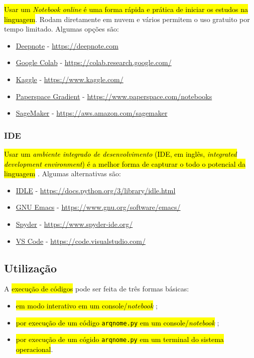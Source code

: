 \documentclass[12pt]{article}
\begin{document}
\hl{Usar um \emph{\textit{Notebook} {\python} \textit{online}} é uma forma rápida e prática de iniciar os estudos na linguagem}. Rodam diretamente em nuvem e vários permitem o uso gratuito por tempo limitado. Algumas opções são:
\begin{itemize}
\item \href{https://deepnote.com}{Deepnote} - \url{https://deepnote.com}
\item \href{https://colab.research.google.com/}{Google Colab} - \url{https://colab.research.google.com/}
\item \href{https://www.kaggle.com/}{Kaggle} - \url{https://www.kaggle.com/}
\item \href{https://www.paperspace.com/notebooks}{Paperspace Gradient} - \url{https://www.paperspace.com/notebooks}
\item \href{https://aws.amazon.com/sagemaker/}{SageMaker} - \url{https://aws.amazon.com/sagemaker}
\end{itemize}

\subsubsection{IDE}

\hl{Usar um \emph{ambiente integrado de desenvolvimento} (IDE, em inglês, \textit{integrated development environment}) é a melhor forma de capturar o todo o potencial da linguagem {\python}}. Algumas alternativas são:
\begin{itemize}
\item \href{https://docs.python.org/3/library/idle.html}{IDLE} - \url{https://docs.python.org/3/library/idle.html}
\item \href{https://www.gnu.org/software/emacs/download.html}{GNU Emacs} - \url{https://www.gnu.org/software/emacs/}
\item \href{https://www.spyder-ide.org/}{Spyder} - \url{https://www.spyder-ide.org/}
\item \href{https://code.visualstudio.com/}{VS Code} - \url{https://code.visualstudio.com/}
\end{itemize}

\subsection{Utilização}

A \hl{execução de códigos {\python}} pode ser feita de três formas básicas:
\begin{itemize}
\item \hl{em modo interativo em um console/\textit{notebook} {\python}};
\item \hl{por execução de um código \texttt{arqnome.py} em um console/\textit{notebook} {\python}};
\item \hl{por execução de um cógido \texttt{arqnome.py} em um terminal do sistema operacional}.
\end{itemize}
\end{document}
